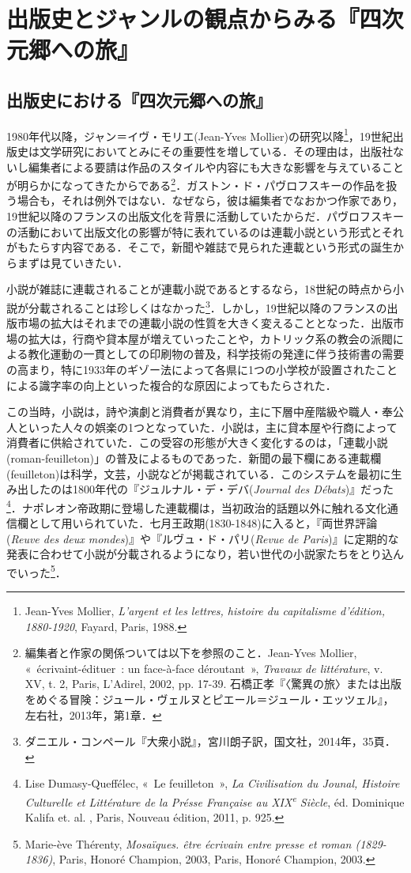 \chapter{出版史とジャンルの観点からみる『四次元郷への旅』}
\section{出版史における『四次元郷への旅』}
1980年代以降，ジャン＝イヴ・モリエ(Jean-Yves Mollier)の研究以降\footnote{Jean-Yves Mollier, \emph{L'argent et les lettres, histoire du capitalisme d'édition, 1880-1920}, Fayard, Paris, 1988.}，19世紀出版史は文学研究においてとみにその重要性を増している．その理由は，出版社ないし編集者による要請は作品のスタイルや内容にも大きな影響を与えていることが明らかになってきたからである\footnote{編集者と作家の関係ついては以下を参照のこと．Jean-Yves Mollier, «~écrivaint-édituer~: un face-à-face déroutant~», \emph{Travaux de littérature}, v. XV, t. 2, Paris, L'Adirel, 2002, pp. 17-39. 石橋正孝『〈驚異の旅〉または出版をめぐる冒険：ジュール・ヴェルヌとピエール＝ジュール・エッツェル』，左右社，2013年，第1章．}．ガストン・ド・パヴロフスキーの作品を扱う場合も，それは例外ではない．なぜなら，彼は編集者でなおかつ作家であり，19世紀以降のフランスの出版文化を背景に活動していたからだ．パヴロフスキーの活動において出版文化の影響が特に表れているのは連載小説という形式とそれがもたらす内容である．そこで，新聞や雑誌で見られた連載という形式の誕生からまずは見ていきたい．

小説が雑誌に連載されることが連載小説であるとするなら，18世紀の時点から小説が分載されることは珍しくはなかった\footnote{ダニエル・コンペール『大衆小説』，宮川朗子訳，国文社，2014年，35頁．}．しかし，19世紀以降のフランスの出版市場の拡大はそれまでの連載小説の性質を大きく変えることとなった．出版市場の拡大は，行商や貸本屋が増えていったことや，カトリック系の教会の派閥による教化運動の一貫としての印刷物の普及，科学技術の発達に伴う技術書の需要の高まり，特に1933年のギゾー法によって各県に1つの小学校が設置されたことによる識字率の向上といった複合的な原因によってもたらされた．

この当時，小説は，詩や演劇と消費者が異なり，主に下層中産階級や職人・奉公人といった人々の娯楽の1つとなっていた．小説は，主に貸本屋や行商によって消費者に供給されていた．この受容の形態が大きく変化するのは，「連載小説(roman-feuilleton)」の普及によるものであった．新聞の最下欄にある連載欄(feuilleton)は科学，文芸，小説などが掲載されている．このシステムを最初に生み出したのは1800年代の『ジュルナル・デ・デバ(\emph{Journal des Débats})』だった\footnote{Lise Dumasy-Queffélec, «~Le feuilleton~», \emph{La Civilisation du Jounal, Histoire Culturelle et Littérature de la Présse Française au XIX\textsuperscript{e} Siècle}, éd. Dominique Kalifa et. al. , Paris, Nouveau édition, 2011, p. 925.}．ナポレオン帝政期に登場した連載欄は，当初政治的話題以外に触れる文化通信欄として用いられていた．七月王政期(1830-1848)に入ると，『両世界評論(\emph{Reuve des deux mondes})』や『ルヴュ・ド・パリ(\emph{Revue de Paris})』に定期的な発表に合わせて小説が分載されるようになり，若い世代の小説家たちをとり込んでいった\footnote{Marie-ève Thérenty, \emph{Mosaïques. être écrivain entre presse et roman (1829-1836)}, Paris, Honoré Champion, 2003, Paris, Honoré Champion, 2003.}．

